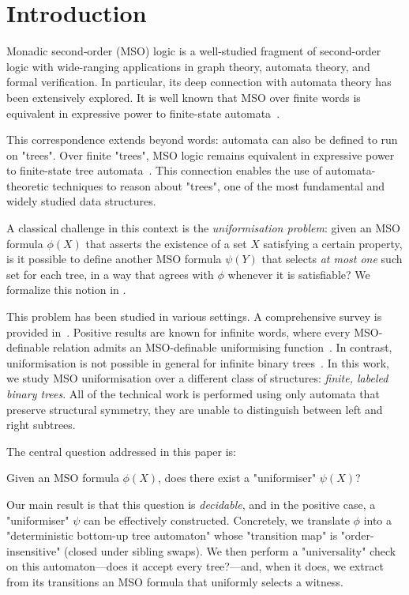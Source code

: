 \documentclass[twoside]{article}
\begin{document}
\section{Introduction}

Monadic second‐order (MSO) logic is a well-studied fragment of second-order logic with wide-ranging applications in graph theory, automata theory, and formal verification.
In particular, its deep connection with automata theory has been extensively explored. It is well known that MSO over finite words is equivalent in expressive power to
finite-state automata~\cite{buchi60}.

This correspondence extends beyond words: automata can also be defined to run on "trees". Over finite "trees", MSO logic remains equivalent in expressive power to finite-state
tree automata~\cite{TW68, Don70}. This connection enables the use of automata-theoretic techniques to reason about "trees", one of the most fundamental and widely studied data
structures.

A classical challenge in this context is the \emph{uniformisation problem}: given an MSO formula $\phi(X)$ that asserts the existence of a set $X$ satisfying a certain property,
is it possible to define another MSO formula $\psi(Y)$ that selects \emph{at most one} such set for each tree, in a way that agrees with $\phi$ whenever it is satisfiable? We
formalize this notion in .

This problem has been studied in various settings. A comprehensive survey is provided in~\cite{Cara15}. Positive results are known for infinite words, where every MSO-definable
relation admits an MSO-definable uniformising function~\cite{Siefkes1975, Choffrut1999, Rabin07}. In contrast, uniformisation is not possible in general for infinite binary
trees~\cite{GS83}.
In this work, we study MSO uniformisation over a different class of structures: \emph{finite, labeled binary trees}.
All of the technical work is performed using only automata that preserve structural symmetry,
\ie they are unable to distinguish between left and right subtrees.

The central question addressed in this paper is:

\begin{problem}\label{prob:uniformisation-problem}
\AP Given an MSO formula $\phi(X)$, does there exist a "uniformiser" $\psi(X)$?
\end{problem}

Our main result is that this question is \emph{decidable}, and in the positive case, a "uniformiser" $\psi$ can be effectively constructed. Concretely, we translate $\phi$ into a
"deterministic bottom-up tree automaton" whose "transition map" is "order-insensitive" (\ie closed under sibling swaps). We then perform a "universality" check on this
automaton—does it accept every tree?—and, when it does, we extract from its transitions an MSO formula that uniformly selects a witness.
\end{document}
